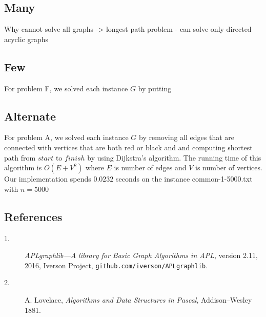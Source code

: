 \documentclass{tufte-handout}
\begin{document}
\subsection{Many}
Why cannot solve all graphs -> longest path problem - can solve only directed acyclic graphs

\subsection{Few}

For problem F, we solved each instance $G$ by putting 

\subsection{Alternate}

For  problem A, we solved each instance $G$ by removing all edges that are connected with vertices that are both red or black and and computing shortest path from $start$ to $finish$ by using Dijkstra's algorithm.
The running time of this algorithm is $O(E + V^2)$ where  $E$ is number of edges and $V$ is number of vertices. Our implementation spends $0.0232$ seconds on the instance common-1-5000.txt with $n = 5000$

\subsection{References}
\begin{description}
  \item[1.] \emph{APLgraphlib---A library for Basic Graph Algorithms in APL}, version 2.11, 2016, Iverson Project, {\tt github.com/iverson/APLgraphlib}.

  \item[2.] A. Lovelace, \emph{Algorithms and Data Structures in Pascal}, Addison--Wesley 1881. 
\end{description}
\end{document}
